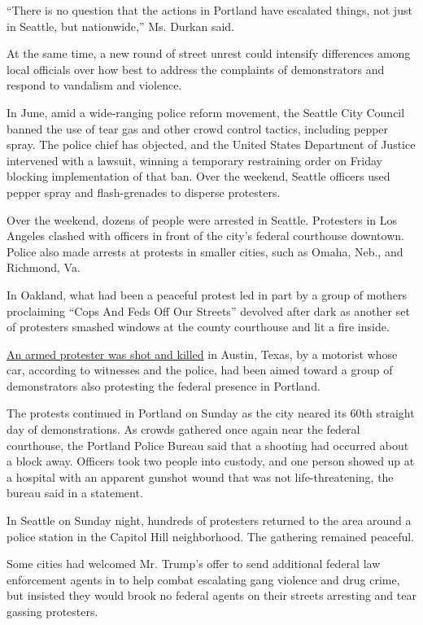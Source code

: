 ``There is no question that the actions in Portland have escalated
things, not just in Seattle, but nationwide,'' Ms. Durkan said.

At the same time, a new round of street unrest could intensify
differences among local officials over how best to address the
complaints of demonstrators and respond to vandalism and violence.

In June, amid a wide-ranging police reform movement, the Seattle City
Council banned the use of tear gas and other crowd control tactics,
including pepper spray. The police chief has objected, and the United
States Department of Justice intervened with a lawsuit, winning a
temporary restraining order on Friday blocking implementation of that
ban. Over the weekend, Seattle officers used pepper spray and
flash-grenades to disperse protesters.

Over the weekend, dozens of people were arrested in Seattle. Protesters
in Los Angeles clashed with officers in front of the city's federal
courthouse downtown. Police also made arrests at protests in smaller
cities, such as Omaha, Neb., and Richmond, Va.

In Oakland, what had been a peaceful protest led in part by a group of
mothers proclaiming ``Cops And Feds Off Our Streets'' devolved after
dark as another set of protesters smashed windows at the county
courthouse and lit a fire inside.

\href{https://www.nytimes3xbfgragh.onion/2020/07/26/us/austin-shooting-texas-protests.html}{An
armed protester was shot and killed} in Austin, Texas, by a motorist
whose car, according to witnesses and the police, had been aimed toward
a group of demonstrators also protesting the federal presence in
Portland.

The protests continued in Portland on Sunday as the city neared its 60th
straight day of demonstrations. As crowds gathered once again near the
federal courthouse, the Portland Police Bureau said that a shooting had
occurred about a block away. Officers took two people into custody, and
one person showed up at a hospital with an apparent gunshot wound that
was not life-threatening, the bureau said in a statement.

In Seattle on Sunday night, hundreds of protesters returned to the area
around a police station in the Capitol Hill neighborhood. The gathering
remained peaceful.

Some cities had welcomed Mr. Trump's offer to send additional federal
law enforcement agents in to help combat escalating gang violence and
drug crime, but insisted they would brook no federal agents on their
streets arresting and tear gassing protesters.

